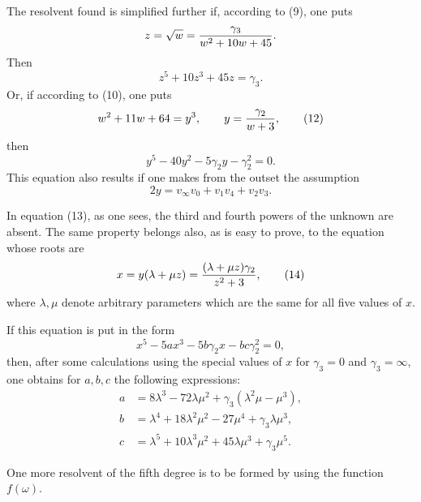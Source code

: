 \documentclass[11pt]{article}
\begin{document}
The resolvent found is simplified further if, according to (9), one puts
\[
 z=\sqrt w={\gamma_3\over w^2+10w+45}.
\]
Then
\begin{equation}
 z^5+10z^3+45z=\gamma_3.
\tag{11}
\end{equation}
Or, if according to (10), one puts
\begin{equation}
 w^2+11w+64=y^3,\qquad y={\gamma_2\over w+3},
\tag{12}
\end{equation}
then
\begin{equation}
 y^5-40y^2-5\gamma_2y-\gamma_2^2=0.
\tag{13}
\end{equation}
This equation also results if one makes from the outset the assumption
\[
 2y=v_\infty v_0+v_1v_4+v_2v_3.
\]

In equation (13), as one sees, the third and fourth powers of the unknown are absent. The same property belongs also, as is easy to prove, to the equation whose roots are
\begin{equation}
 x=y(\lambda+\mu z)={(\lambda+\mu z)\gamma_2\over z^2+3},
\tag{14}
\end{equation}
where \(\lambda,\mu\) denote arbitrary parameters which are the same for all five values of \(x\).

If this equation is put in the form
\begin{equation}
 x^5-5ax^3-5b\gamma_2 x-bc\gamma_2^2=0,
\tag{15}
\end{equation}
then, after some calculations using the special values of \(x\) for \(\gamma_3=0\) and \(\gamma_3=\infty\), one obtains for \(a,b,c\) the following expressions:
\begin{equation}
\begin{aligned}
 a&=8\lambda^3-72\lambda\mu^2+\gamma_3(\lambda^2\mu-\mu^3),\\
 b&=\lambda^4+18\lambda^2\mu^2-27\mu^4+\gamma_3\lambda\mu^3,\\
 c&=\lambda^5+10\lambda^3\mu^2+45\lambda\mu^3+\gamma_3\mu^5.
\end{aligned}
\tag{16}
\end{equation}

One more resolvent of the fifth degree is to be formed by using the function \(f(\omega)\).
\end{document}
